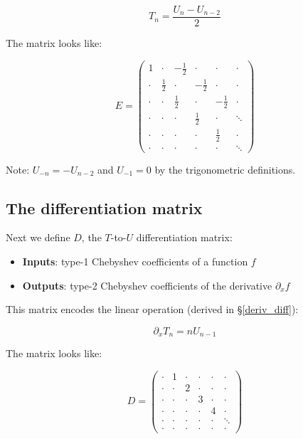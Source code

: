 \documentclass{article}
\begin{document}
\begin{equation}
T_n = \frac{U_n - U_{n-2}}{2}
\end{equation} 

The matrix looks like:

\begin{equation*}
\renewcommand*{\arraystretch}{1.5}
E =
\begin{pmatrix}
1 & \cdot & -\frac{1}{2} & \cdot & \cdot & \cdot \\
\cdot & \frac{1}{2} & \cdot & -\frac{1}{2} & \cdot & \cdot \\
\cdot & \cdot & \frac{1}{2} & \cdot & -\frac{1}{2} & \cdot \\
\cdot & \cdot & \cdot & \frac{1}{2} & \cdot & \ddots \\
\cdot & \cdot & \cdot & \cdot & \frac{1}{2} & \cdot \\
\cdot & \cdot & \cdot & \cdot & \cdot & \ddots
\end{pmatrix}
\end{equation*}

Note: $U_{-n} = - U_{n-2}$ and $U_{-1} = 0$ by the trigonometric definitions. 

\subsection{The differentiation matrix}

Next we define $D$, the $T$-to-$U$ differentiation matrix:

\begin{itemize}
    \item \textbf{Inputs}: type-1 Chebyshev coefficients of a function $f$
    \item \textbf{Outputs}: type-2 Chebyshev coefficients of the derivative $\partial_x f$
\end{itemize}

This matrix encodes the linear operation (derived in \S \ref{deriv_diff}):

\begin{equation}
\partial_x T_n = n U_{n-1}
\end{equation}

The matrix looks like:

\begin{equation*}
\renewcommand*{\arraystretch}{1.2}
D =
\begin{pmatrix}
\cdot & 1 & \cdot & \cdot & \cdot & \cdot \\
\cdot & \cdot & 2 & \cdot & \cdot & \cdot \\
\cdot & \cdot & \cdot & 3 & \cdot & \cdot \\
\cdot & \cdot & \cdot & \cdot & 4 & \cdot \\
\cdot & \cdot & \cdot & \cdot & \cdot & \ddots \\
\cdot & \cdot & \cdot & \cdot & \cdot & \cdot
\end{pmatrix}
\end{equation*}
\end{document}
